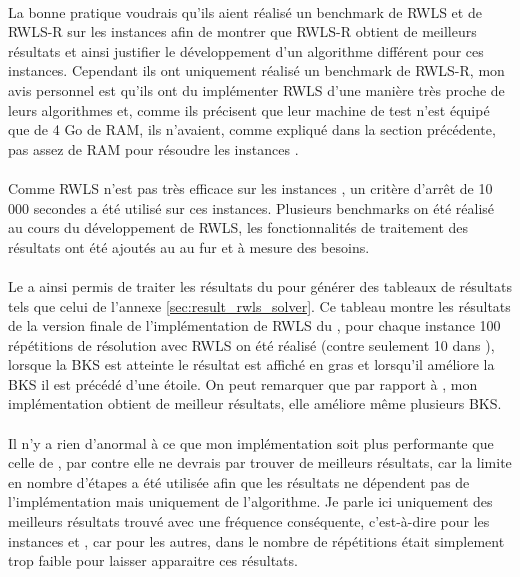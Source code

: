 \documentclass[a4paper,11pt,twoside,french,report]{../common/simplem}
\begin{document}
				\paragraph*{}
					La bonne pratique voudrais qu'ils aient réalisé un benchmark de \gls{RWLS} et de \gls{RWLS}-R sur les instances  afin de montrer que \gls{RWLS}-R obtient de meilleurs résultats et ainsi justifier le développement d'un algorithme différent pour ces instances. Cependant ils ont uniquement réalisé un benchmark de \gls{RWLS}-R, mon avis personnel est qu'ils ont du implémenter \gls{RWLS} d'une manière très proche de leurs algorithmes et, comme ils précisent que leur machine de test n'est équipé que de 4 Go de RAM, ils n'avaient, comme expliqué dans la section précédente, pas assez de RAM pour résoudre les instances .
				\paragraph*{}
					Comme \gls{RWLS} n'est pas très efficace sur les instances , un critère d'arrêt de 10\,000 secondes a été utilisé sur ces instances. Plusieurs benchmarks on été réalisé au cours du développement de \gls{RWLS}, les fonctionnalités de traitement des résultats ont été ajoutés au \printer{} au fur et à mesure des besoins.
				\paragraph*{}
					Le \printer{} a ainsi permis de traiter les résultats du \solver{} pour générer des tableaux de résultats tels que celui de l'annexe \ref{sec:result_rwls_solver}. Ce tableau montre les résultats de la version finale de l'implémentation de \gls{RWLS} du \solver{}, pour chaque instance 100 répétitions de résolution avec \gls{RWLS} on été réalisé (contre seulement 10 dans \cite{Gao2015}), lorsque la \gls{BKS} est atteinte le résultat est affiché en gras et lorsqu'il améliore la \gls{BKS} il est précédé d'une étoile. On peut remarquer que par rapport à \cite{Gao2015}, mon implémentation obtient de meilleur résultats, elle améliore même plusieurs \gls{BKS}.
				\paragraph*{}
					Il n'y a rien d'anormal à ce que mon implémentation soit plus performante que celle de \cite{Gao2015}, par contre elle ne devrais par trouver de meilleurs résultats, car la limite en nombre d'étapes a été utilisée afin que les résultats ne dépendent pas de l'implémentation mais uniquement de l'algorithme. Je parle ici uniquement des meilleurs résultats trouvé avec une fréquence conséquente, c'est-à-dire pour les instances  et , car pour les autres, dans \cite{Gao2015} le nombre de répétitions était simplement trop faible pour laisser apparaitre ces résultats.
\end{document}
